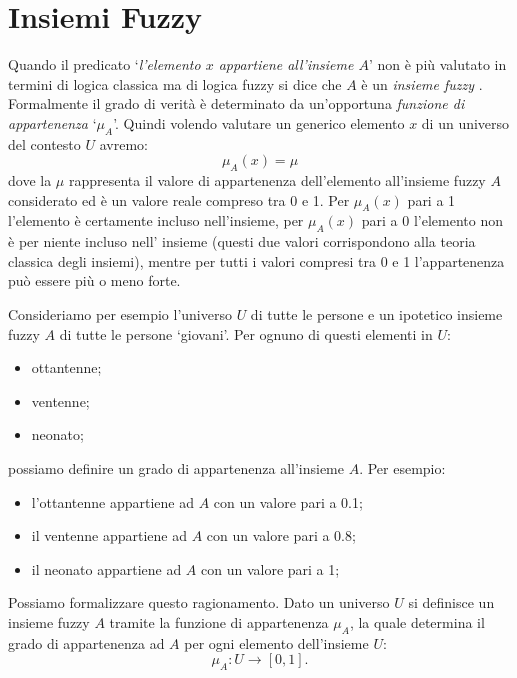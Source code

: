 \documentclass[a4paper,12pt]{report}
\begin{document}
\newpage

\section{Insiemi Fuzzy}
Quando il predicato `\textit{l'elemento $x$ appartiene all'insieme $A$}' non è  più valutato in termini di logica classica ma di logica fuzzy si dice che $A$ è un \textit{insieme fuzzy} \cite{logica_fuzzy}. 
Formalmente il grado di verità è determinato da un'opportuna \textit{funzione di appartenenza} `$\mu_A$'. Quindi volendo valutare un generico elemento $x$ di un universo del contesto $U$ avremo:
\begin{equation*}
    \mu_A(x) = \mu
\end{equation*}
\noindent 
dove la $\mu$ rappresenta il valore di appartenenza dell'elemento all'insieme fuzzy $A$ considerato ed è un valore reale compreso tra 0 e 1. 
Per $\mu_A(x)$ pari a 1 l’elemento è certamente incluso nell’insieme, per $\mu_A(x)$ pari a 0
l’elemento non è per niente incluso nell’ insieme (questi due valori corrispondono alla teoria classica degli insiemi), mentre per tutti i valori compresi tra 0 e 1 l’appartenenza può essere più o meno forte.

\bigskip

Consideriamo per esempio l'universo $U$ di tutte le persone e un ipotetico insieme fuzzy $A$ di tutte le persone `giovani'. Per ognuno di questi elementi in $U$:
\begin{itemize}
    \item ottantenne;
    \item ventenne;
    \item neonato;
\end{itemize}
possiamo definire un grado di appartenenza all'insieme $A$. Per esempio:
\begin{itemize}
    \item l'ottantenne appartiene ad $A$ con un valore pari a 0.1;
    \item il ventenne appartiene ad $A$ con un valore pari a 0.8;
    \item il neonato appartiene ad $A$ con un valore pari a 1;
\end{itemize}
Possiamo formalizzare questo ragionamento.
Dato un universo $U$ si definisce un insieme fuzzy $A$ tramite la funzione di appartenenza $\mu_A$, la quale determina il grado di appartenenza ad $A$ per ogni elemento dell'insieme $U$:
\begin{equation*}
    \mu_A : U \to [0,1].
\end{equation*}
\end{document}
